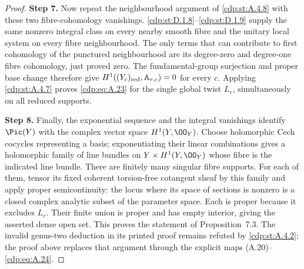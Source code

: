 \begin{proof}
\noindent\textbf{Step 7.} Now repeat the neighbourhood argument of \ref{cdp:st:A.4.8} with these two fibre-cohomology vanishings. \ref{cdp:st:D.1.8}--\ref{cdp:st:D.1.9} supply the same nonzero integral class on every nearby smooth fibre and the unitary local system on every fibre neighbourhood. The only terms that can contribute to first cohomology of the punctured neighbourhood are its degree-zero and degree-one fibre cohomology, just proved zero. The fundamental-group surjection and proper base change therefore give $H^1((Y_c)_{\rm red},\mathbb A_{r,c})=0$ for every $c$. Applying \ref{cdp:st:A.4.7} proves \eqref{cdp:eq:A.23} for the single global twist $L_r$, simultaneously on all reduced supports.

\noindent\textbf{Step 8.} Finally, the exponential sequence and the integral vanishings identify $\Pic(Y)$ with the complex vector space $H^1(Y,\OO_Y)$. Choose holomorphic Cech cocycles representing a basis; exponentiating their linear combinations gives a holomorphic family of line bundles on $Y\times H^1(Y,\OO_Y)$ whose fibre is the indicated line bundle. There are finitely many singular fibre supports. For each of them, tensor its fixed coherent torsion-free cotangent sheaf by this family and apply proper semicontinuity: the locus where its space of sections is nonzero is a closed complex analytic subset of the parameter space. Each is proper because it excludes $L_r$. Their finite union is proper and has empty interior, giving the asserted dense open set. This proves the statement of Proposition~7.3. The invalid genus-two deduction in its printed proof remains refuted by \ref{cdp:st:A.4.2}; the proof above replaces that argument through the explicit maps (A.20)--\eqref{cdp:eq:A.24}.
\end{proof}
